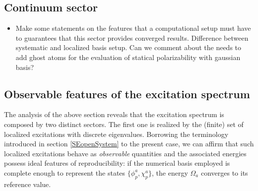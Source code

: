 \documentclass[reprint,aps,prb]{revtex4-1}
\begin{document}
\subsection{Continuum sector}

\begin{itemize}
 \item Make some statements on the features that a computational setup must have to guarantees that this sector provides converged results. Difference between systematic and localized basis setup. Can we comment about the needs to add ghost atoms for the evaluation of statical polarizability with gaussian basis?
\end{itemize}


\vspace{1cm}

\subsection{Observable features of the excitation spectrum}

The analysis of the above section reveals that the excitation spectrum is composed by two distinct sectors.
The first one is realized by the (finite) set of localized excitations with discrete eigenvalues.
Borrowing the terminology introduced in section \ref{SEopenSystem} to the present case, we can affirm that such localized excitations behave as
\emph{observable} quantities and the associated energies possess ideal features of reproducibility:
if the numerical basis employed is complete enough to
represent the states $\{\phi_p^a,\chi_p^a\}$, the energy $\Omega_a$
converges to its reference value.
\end{document}
